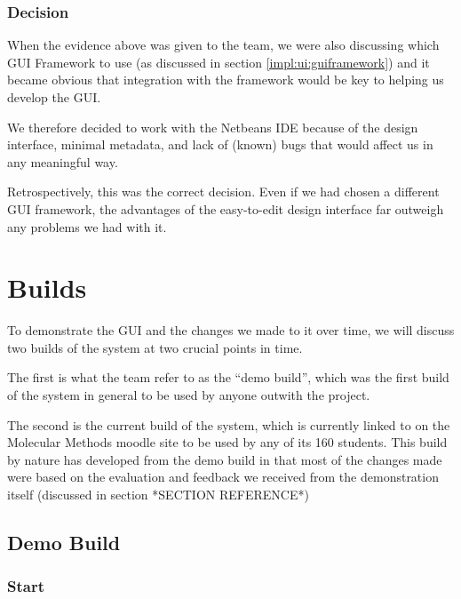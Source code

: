 \subsubsection{Decision}
\label{impl:ui:ide:decision}

When the evidence above was given to the team, we were also discussing
which GUI Framework to use (as discussed in section
\ref{impl:ui:guiframework}) and it became obvious that integration
with the framework would be key to helping us develop the GUI.

We therefore decided to work with the Netbeans IDE because of the
design interface, minimal metadata, and lack of (known) bugs that
would affect us in any meaningful way.

Retrospectively, this was the correct decision.
Even if we had chosen a different GUI framework, the advantages of the
easy-to-edit design interface far outweigh any problems we had with
it.

\section{Builds}
\label{impl:ui:builds}

To demonstrate the GUI and the changes we made to it over time, we
will discuss two builds of the system at two crucial points in time.

The first is what the team refer to as the ``demo build'', which was
the first build of the system in general to be used by anyone outwith
the project.

The second is the current build of the system, which is currently
linked to on the Molecular Methods moodle site to be used by any of
its 160 students.
This build by nature has developed from the demo build in that most of
the changes made were based on the evaluation and feedback we received
from the demonstration itself (discussed in section *SECTION
REFERENCE*)

\subsection{Demo Build}

\subsubsection{Start}

